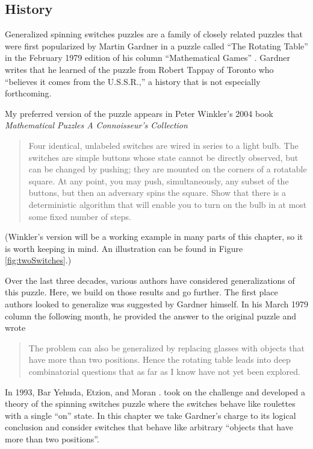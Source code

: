 \subsection{History}
Generalized spinning switches puzzles are a family of closely related puzzles
that were first popularized by Martin Gardner  in a puzzle called
``The Rotating Table''
in the February 1979 edition of his column ``Mathematical Games'' \cite{Gardner1979Problem}.
Gardner writes that he learned of the puzzle from Robert Tappay of Toronto who
``believes it comes from the U.S.S.R.,'' a history that is not especially
forthcoming.

My preferred version of the puzzle appears in Peter Winkler's 2004 book
\textit{Mathematical Puzzles A Connoisseur's Collection} \cite{Winkler2004}
\begin{quote}
  Four identical, unlabeled switches are wired in series to a light bulb.
  The switches are simple buttons whose state cannot be directly observed,
  but can be changed by pushing; they are mounted on the corners of a
  rotatable square. At any point, you may push, simultaneously, any subset
  of the buttons, but then an adversary spins the square. Show that there
  is a deterministic algorithm that will enable you to turn on the bulb in
  at most some fixed number of steps.
\end{quote}

(Winkler's version will be a working example in many parts of this chapter, so it
is worth keeping in mind.
An illustration can be found in Figure \ref{fig:twoSwitches}.)

Over the last three decades, various authors have considered generalizations of
this puzzle. Here, we build on those results and go further.
The first place authors looked to generalize was suggested by Gardner himself.
In his March 1979 column the following month, he provided the answer to the
original puzzle and wrote
\begin{quote}
The problem can also be generalized by replacing glasses with objects that
have more than two positions. Hence the rotating table leads into deep
combinatorial questions that as far as I know have not yet been explored.
\cite{Gardner1979Solution}
\end{quote}

In 1993, Bar Yehuda, Etzion, and Moran \cite{BarYehuda1993}. took on the challenge and developed a theory
of the spinning switches puzzle where the switches behave like roulettes
with a single ``on'' state. In this chapter we take Gardner's charge to
its logical conclusion and consider switches that behave like arbitrary
``objects that have more than two positions''.

